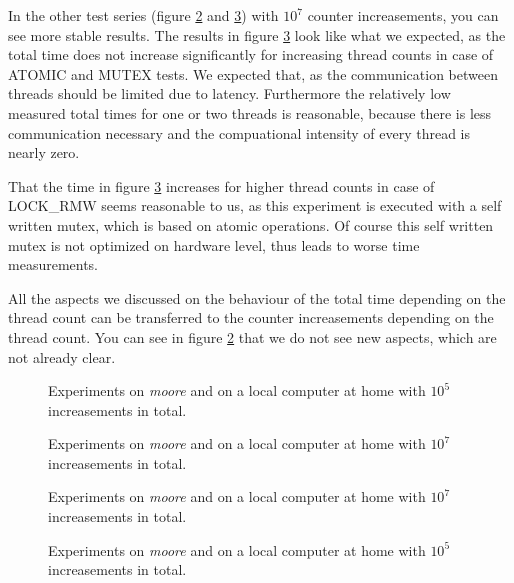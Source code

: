 \documentclass[DIV=12,oneside,a4paper]{scrartcl}
\begin{document}
In the other test series (figure \ref{plotbig} and \ref{plotbigtotal}) with
$10^7$ counter increasements, you can see more stable results. The results
in figure \ref{plotbigtotal} look like what we expected, as the total
time does not increase significantly for increasing thread counts
in case of ATOMIC and MUTEX tests.
We expected that, as the communication between threads should be
limited due to latency. Furthermore the relatively low measured total
times for one or two threads is reasonable, because there is less
communication necessary and the compuational intensity of every thread
is nearly zero.

That the time in figure \ref{plotbigtotal} increases for higher thread
counts in case of LOCK\_RMW seems reasonable to us, as this experiment
is executed with a self written mutex, which is based on atomic operations.
Of course this self written mutex is not optimized on hardware level, thus
leads to worse time measurements.

All the aspects we discussed on the behaviour of the total time depending
on the thread count can be transferred to the counter increasements
depending on the thread count. You can see in figure \ref{plotbig} that
we do not see new aspects, which are not already clear.

\begin{figure}
	\centering
	\caption{Experiments on \emph{moore} and on a local computer at home
	with $10^5$ increasements in total.}
	\label{plot}
\end{figure}

\begin{figure}
	\centering
	\caption{Experiments on \emph{moore} and on a local computer at home
	with $10^7$ increasements in total.}
	\label{plotbig}
\end{figure}

\begin{figure}
	\centering
	\caption{Experiments on \emph{moore} and on a local computer at home
	with $10^7$ increasements in total.}
	\label{plotbigtotal}
\end{figure}
\begin{figure}
	\centering
	\caption{Experiments on \emph{moore} and on a local computer at home
	with $10^5$ increasements in total.}
	\label{plottotal}
\end{figure}
\end{document}
